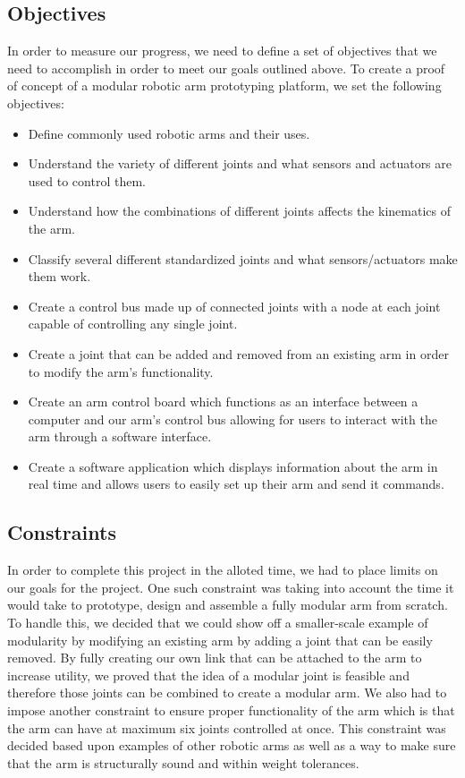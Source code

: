 \subsection{Objectives}
\noindent In order to measure our progress, we need to define a set of objectives that we need to accomplish in order to meet our goals outlined above. To create a proof of concept of a modular robotic arm prototyping platform, we set the following objectives: 
\begin{itemize}
\item Define commonly used robotic arms and their uses.
\item Understand the variety of different joints and what sensors and actuators are used to control them.
\item Understand how the combinations of different joints affects the kinematics of the arm.
\item Classify several different standardized joints and what sensors/actuators make them work.
\item Create a control bus made up of connected joints with a node at each joint capable of controlling any single joint.
\item Create a joint that can be added and removed from an existing arm in order to modify the arm's functionality.
\item Create an arm control board which functions as an interface between a computer and our arm's control bus allowing for users to interact with the arm through a software interface.
\item Create a software application which displays information about the arm in real time and allows users to easily set up their arm and send it commands.
\end{itemize} 

\subsection{Constraints}
\noindent In order to complete this project in the alloted time, we had to place limits on our goals for the project. One such constraint was taking into account the time it would take to prototype, design and assemble a fully modular arm from scratch. To handle this, we decided that we could show off a smaller-scale example of modularity by modifying an existing arm by adding a joint that can be easily removed. By fully creating our own link that can be attached to the arm to increase utility, we proved that the idea of a modular joint is feasible and therefore those joints can be combined to create a modular arm. We also had to impose another constraint to ensure proper functionality of the arm which is that the arm can have at maximum six joints controlled at once. This constraint was decided based upon examples of other robotic arms as well as a way to make sure that the arm is structurally sound and within weight tolerances.


